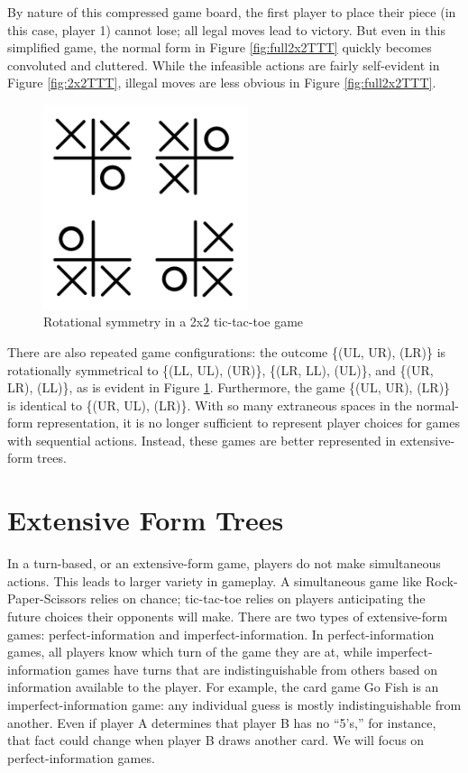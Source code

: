 By nature of this compressed game board, the first player to place their piece (in this case, player 1) cannot lose; all legal moves lead to victory. But even in this simplified game, the normal form in Figure \ref{fig:full2x2TTT} quickly becomes convoluted and cluttered. While the infeasible actions are fairly self-evident in Figure \ref{fig:2x2TTT}, illegal moves are less obvious in Figure \ref{fig:full2x2TTT}.
\begin{figure}[H]
  \centering
  \includegraphics[width=6cm]{figures/TTTRotation.png}
  \caption{Rotational symmetry in a 2x2 tic-tac-toe game}
  \label{fig:2x2TTTRotation}
\end{figure}
There are also repeated game configurations: the outcome \{(UL, UR), (LR)\} is rotationally symmetrical to \{(LL, UL), (UR)\}, \{(LR, LL), (UL)\}, and \{(UR, LR), (LL)\}, as is evident in Figure \ref{fig:2x2TTTRotation}. Furthermore, the game \{(UL, UR), (LR)\} is identical to \{(UR, UL), (LR)\}. With so many extraneous spaces in the normal-form representation, it is no longer sufficient to represent player choices for games with sequential actions. Instead, these games are better represented in extensive-form trees.\\

\section{Extensive Form Trees}
In a turn-based, or an extensive-form game, players do not make simultaneous actions. This leads to larger variety in gameplay. A simultaneous game like Rock-Paper-Scissors relies on chance; tic-tac-toe relies on players anticipating the future choices their opponents will make. There are two types of extensive-form games: perfect-information and imperfect-information. In perfect-information games, all players know which turn of the game they are at, while imperfect-information games have turns that are indistinguishable from others based on information available to the player. For example, the card game Go Fish is an imperfect-information game: any individual guess is mostly indistinguishable from another. Even if player A determines that player B has no ``5's,'' for instance, that fact could change when player B draws another card. We will focus on perfect-information games.\\

